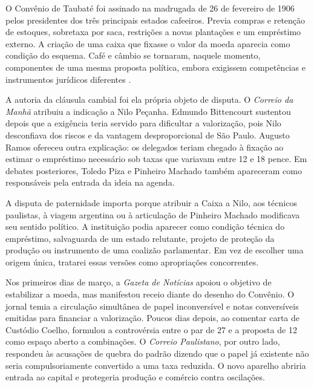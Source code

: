 O Convênio de Taubaté foi assinado na madrugada de 26 de fevereiro de 1906 pelos presidentes dos três principais estados cafeeiros. Previa compras e retenção de estoques, sobretaxa por saca, restrições a novas plantações e um empréstimo externo. A criação de uma caixa que fixasse o valor da moeda aparecia como condição do esquema. Café e câmbio se tornaram, naquele momento, componentes de uma mesma proposta política, embora exigissem competências e instrumentos jurídicos diferentes \cite{holloway1978,torelli2004}.

A autoria da cláusula cambial foi ela própria objeto de disputa. O \textit{Correio da Manhã} atribuiu a indicação a Nilo Peçanha. Edmundo Bittencourt sustentou depois que a exigência teria servido para dificultar a valorização, pois Nilo desconfiava dos riscos e da vantagem desproporcional de São Paulo. Augusto Ramos ofereceu outra explicação: os delegados teriam chegado à fixação ao estimar o empréstimo necessário sob taxas que variavam entre 12 e 18 pence. Em debates posteriores, Toledo Piza e Pinheiro Machado também apareceram como responsáveis pela entrada da ideia na agenda.


A disputa de paternidade importa porque atribuir a Caixa a Nilo, aos técnicos paulistas, à viagem argentina ou à articulação de Pinheiro Machado modificava seu sentido político. A instituição podia aparecer como condição técnica do empréstimo, salvaguarda de um estado relutante, projeto de proteção da produção ou instrumento de uma coalizão parlamentar. Em vez de escolher uma origem única, tratarei essas versões como apropriações concorrentes.

Nos primeiros dias de março, a \textit{Gazeta de Notícias} apoiou o objetivo de estabilizar a moeda, mas manifestou receio diante do desenho do Convênio. O jornal temia a circulação simultânea de papel inconversível e notas conversíveis emitidas para financiar a valorização. Poucos dias depois, ao comentar carta de Custódio Coelho, formulou a controvérsia entre o par de 27 e a proposta de 12 como espaço aberto a combinações. O \textit{Correio Paulistano}, por outro lado, respondeu às acusações de quebra do padrão dizendo que o papel já existente não seria compulsoriamente convertido a uma taxa reduzida. O novo aparelho abriria entrada ao capital e protegeria produção e comércio contra oscilações.

